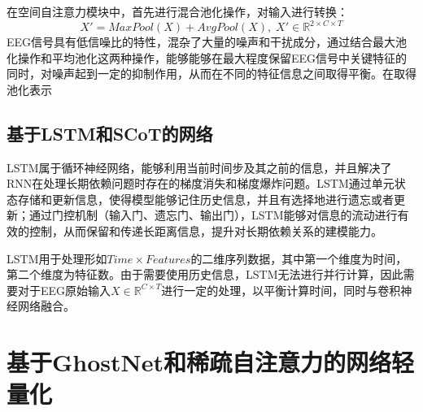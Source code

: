 在空间自注意力模块中，首先进行混合池化操作，对输入进行转换：
\begin{equation}
    X'=MaxPool(X)+AvgPool(X),\;X' \in \mathbb{R}^{2 \times C \times T}
    \label{eq:scots1}
\end{equation}
EEG信号具有低信噪比的特性，混杂了大量的噪声和干扰成分，通过结合最大池化操作和平均池化这两种操作，能够能够在最大程度保留EEG信号中关键特征的同时，对噪声起到一定的抑制作用，从而在不同的特征信息之间取得平衡。在取得池化表示

\subsection{基于LSTM和SCoT的网络}

LSTM属于循环神经网络，能够利用当前时间步及其之前的信息，并且解决了RNN在处理长期依赖问题时存在的梯度消失和梯度爆炸问题。LSTM通过单元状态存储和更新信息，使得模型能够记住历史信息，并且有选择地进行遗忘或者更新；通过门控机制（输入门、遗忘门、输出门），LSTM能够对信息的流动进行有效的控制，从而保留和传递长距离信息，提升对长期依赖关系的建模能力。

LSTM用于处理形如\(Time \times Features\)的二维序列数据，其中第一个维度为时间，第二个维度为特征数。由于需要使用历史信息，LSTM无法进行并行计算，因此需要对于EEG原始输入\(X \in \mathbb{R}^{C \times T}\)进行一定的处理，以平衡计算时间，同时与卷积神经网络融合。



\section{基于GhostNet和稀疏自注意力的网络轻量化}